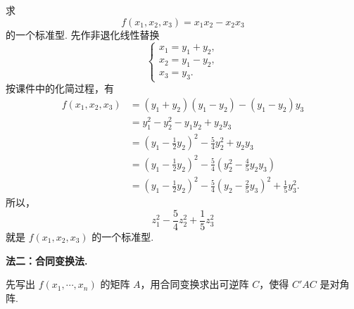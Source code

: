 \begin{example}
	求
	\[
	f(x_1,x_2,x_3)=x_1x_2-x_2x_3
	\]
	的一个标准型. 先作非退化线性替换
	\[
	\begin{cases}
		x_1=y_1+y_2,\\
		x_2=y_1-y_2,\\
		x_3=y_3.
	\end{cases}
	\]
	按课件中的化简过程，有
	\[
	\begin{aligned}
		f(x_1,x_2,x_3)
		&=(y_1+y_2)(y_1-y_2)-(y_1-y_2)y_3\\
		&=y_1^2-y_2^2-y_1y_2+y_2y_3\\
		&=\left(y_1-\frac12y_2\right)^2-\frac54y_2^2+y_2y_3\\
		&=\left(y_1-\frac12y_2\right)^2-
		\frac54\left(y_2^2-\frac45y_2y_3\right)\\
		&=\left(y_1-\frac12y_2\right)^2-
		\frac54\left(y_2-\frac25y_3\right)^2+
		\frac15y_3^2.
	\end{aligned}
	\]
	所以，
	\[
	z_1^2-\frac54z_2^2+\frac15z_3^2
	\]
	就是 $f(x_1,x_2,x_3)$ 的一个标准型.
\end{example}

\noindent\textbf{法二：合同变换法.}

先写出 $f(x_1,\cdots,x_n)$ 的矩阵 $A$，用合同变换求出可逆阵 $C$，使得 $C'AC$ 是对角阵.

